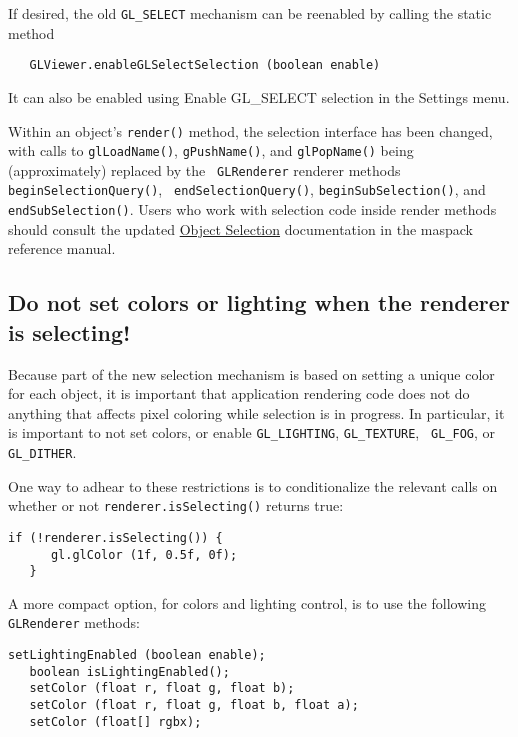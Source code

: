 \documentclass{article}
\begin{document}
If desired, the old {\tt GL\_SELECT} mechanism can be reenabled by
calling the static method
\begin{verbatim}
   GLViewer.enableGLSelectSelection (boolean enable)
\end{verbatim}

It can also be enabled using {\sf Enable GL\_SELECT selection}
in the {\sf Settings} menu.

Within an object's {\tt render()} method, the selection interface has
been changed, with calls to {\tt glLoadName()}, {\tt gPushName()}, and
{\tt glPopName()} being (approximately) replaced by the {\tt
GLRenderer} renderer methods {\tt beginSelectionQuery()}, {\tt
endSelectionQuery()}, {\tt beginSubSelection()}, and {\tt
endSubSelection()}. Users who work with selection code inside render
methods should consult the updated 
\href{http://www.artisynth.org/doc/html/maspack/maspack.html#S3.SS3}%
{Object Selection}
documentation in the maspack
reference manual.

\subsection*{Do not set colors or lighting when the renderer is selecting!}

\begin{sideblock}
Because part of the new selection mechanism is based on setting a
unique color for each object, it is important that application
rendering code does not do anything that affects pixel coloring while
selection is in progress. In particular, it is important to not set
colors, or enable {\tt GL\_LIGHTING}, {\tt GL\_TEXTURE}, {\tt
GL\_FOG}, or {\tt GL\_DITHER}.
\end{sideblock}

One way to adhear to these restrictions is to conditionalize the
relevant calls on whether or not {\tt renderer.isSelecting()} returns
true:
\begin{lstlisting}[]
   if (!renderer.isSelecting()) {
      gl.glColor (1f, 0.5f, 0f);
   }
\end{lstlisting}
A more compact option, for colors and lighting control, is to use the
following {\tt GLRenderer} methods:
\begin{lstlisting}[]
   setLightingEnabled (boolean enable);
   boolean isLightingEnabled();
   setColor (float r, float g, float b);
   setColor (float r, float g, float b, float a);
   setColor (float[] rgbx);
\end{lstlisting}
\end{document}
